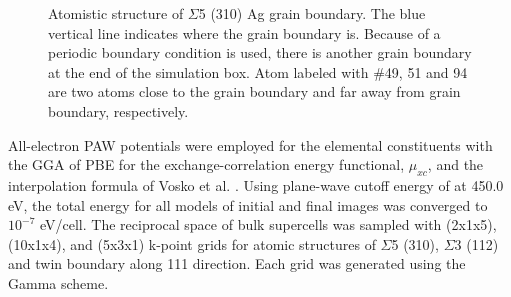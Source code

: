 \begingroup
\begin{figure}[!ht]
  \centering
  \caption[Atomistic structure of $\Sigma$5 (310) Ag grain boundary.]{Atomistic structure of $\Sigma$5 (310) Ag grain boundary. The blue vertical line indicates where the grain boundary is. Because of a periodic boundary condition is used, there is another grain boundary at the end of the simulation box. Atom labeled with \#49, 51 and 94 are two atoms close to the grain boundary and far away from grain boundary, respectively.}
  \label{Chap:Ag/ZnO:fig16}
\end{figure}
\endgroup


All-electron \ac{PAW} potentials were employed for the elemental constituents with the \ac{GGA} of \ac{PBE} for the exchange-correlation energy functional, $\mu_{xc}$, and the interpolation formula of Vosko et al. \cite{vosko1980accurate}. Using plane-wave cutoff energy of at 450.0 eV, the total energy for all models of initial and final images was converged to $10^{−7}$ eV/cell. The reciprocal space of bulk supercells was sampled with (2x1x5), (10x1x4), and (5x3x1) k-point grids for atomic structures of $\Sigma$5 (310), $\Sigma$3 (112) and twin boundary along {111} direction. Each grid was generated using the Gamma scheme.


